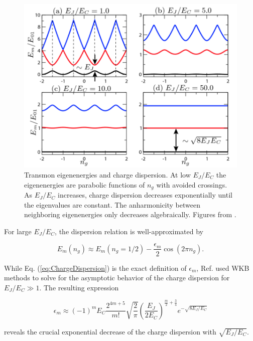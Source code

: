 \documentclass[11 pt, oneside]{book} %
\begin{document}
\begin{figure}[h] 
   \centering
   \includegraphics[width=5in]{Koch-Transmon-eigenenergies.png} 
   \caption[Transmon eigenenergies and charge dispersion]{Transmon eigenenergies and charge dispersion. At low $E_J/E_C$ the eigenenergies are parabolic functions of $n_g$ with avoided crossings. As $E_J/E_C$ increases, charge dispersion decreases exponentially until the eigenvalues are constant. The anharmonicity between neighboring eigenenergies only decreases algebraically. Figures from \cite{Koch}.}
   \label{fig:KochEigenenergies}
\end{figure}

For large $E_J/E_C$, the dispersion relation is well-approximated by

\begin{equation}
E_m(n_g)\approx E_m(n_g=1/2)-\frac{\epsilon_m}{2}\cos(2\pi n_g).
\end{equation}

While Eq. (\ref{eq:ChargeDispersion}) is the exact definition of $\epsilon_m$, Ref. \cite{Koch} used WKB methods to solve for the asymptotic behavior of the charge dispersion for $E_J/E_C\gg 1$. The resulting expression

\begin{equation}
\epsilon_m\approx(-1)^m E_C \frac{2^{4m+5}}{m!}\sqrt{\frac{2}{\pi}}\left(\frac{E_J}{2E_C} \right)^{\frac{m}{2}+\frac{3}{4}}e^{-\sqrt{8E_J/E_C}}
\end{equation}

reveals the crucial exponential decrease of the charge dispersion with $\sqrt{E_J/E_C}$.
\end{document}
